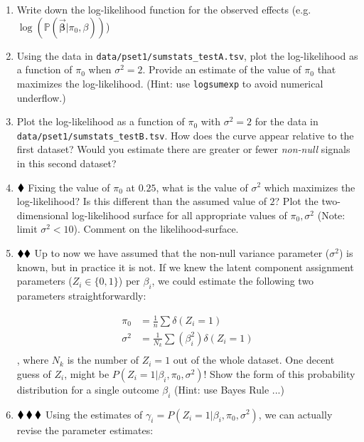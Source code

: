 \documentclass{pset}
\begin{document}
\begin{enumerate}
\item Write down the log-likelihood function for the observed effects (e.g. $\log (\mathbb{P}(\overrightarrow{\mathbf{\beta}} | \pi_0, \beta))$)
\item Using the data in \texttt{data/pset1/sumstats\_testA.tsv}, plot the log-likelihood as a function of $\pi_0$ when $\sigma^2 = 2$. Provide an estimate of the value of $\pi_0$ that maximizes the log-likelihood. (Hint: use \texttt{logsumexp} to avoid numerical underflow.)
\item Plot the log-likelihood as a function of $\pi_0$ with $\sigma^2 = 2$ for the data in \texttt{data/pset1/sumstats\_testB.tsv}. How does the curve appear relative to the first dataset? Would you estimate there are greater or fewer \textit{non-null} signals in this second dataset?
\item $\mathbin{\blacklozenge}$ Fixing the value of $\pi_0$ at $0.25$, what is the value of $\sigma^2$ which maximizes the log-likelihood? Is this different than the assumed value of $2$? Plot the two-dimensional log-likelihood surface for all appropriate values of $\pi_0, \sigma^2$ (Note: limit $\sigma^2 < 10$). Comment on the likelihood-surface.
\item $\mathbin{\blacklozenge}\mathbin{\blacklozenge}$ Up to now we have assumed that the non-null variance parameter ($\sigma^2$) is known, but in practice it is not. If we knew the latent component assignment parameters ($Z_i \in \{0, 1\}$) per $\beta_i$, we could estimate the following two parameters straightforwardly: 

$$
\begin{aligned}
\pi_0 &= \frac{1}{n}\sum \delta(Z_i = 1)\\
\sigma^2 &= \frac{1}{N_k} \sum (\beta_i^2)\delta(Z_i = 1)\\
\end{aligned}
$$
, where $N_k$ is the number of $Z_i = 1$ out of the whole dataset. One decent guess of $Z_i$, might be $P(Z_i = 1 | \beta_i, \pi_0, \sigma^2)$! Show the form of this probability distribution for a single outcome $\beta_i$ (Hint: use Bayes Rule ...)

\item $\mathbin{\blacklozenge}\mathbin{\blacklozenge}\mathbin{\blacklozenge}$ Using the estimates of $\gamma_i = P(Z_i = 1 | \beta_i, \pi_0, \sigma^2)$, we can actually revise the parameter estimates: 


\end{enumerate}
\end{document}
